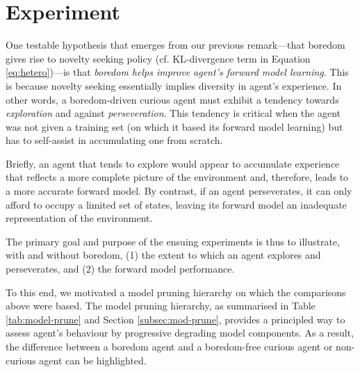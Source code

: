 \documentclass[utf8]{frontiersSCNS}
\newcommand{\bs}{\boldsymbol}
\begin{document}
%


\section{Experiment}

One testable hypothesis that emerges from our previous remark---that boredom gives rise to novelty seeking policy (cf. KL-divergence term in Equation \ref{eq:hetero})---is that {\it boredom helps improve agent's forward model learning}. This is because novelty seeking essentially implies diversity in agent's experience. In other words, a boredom-driven curious agent must exhibit a tendency towards {\it exploration} and against {\it perseveration}. This tendency is critical when the agent was not given a training set (on which it based its forward model learning) but has to self-assist in accumulating one from scratch. 

Briefly, an agent that tends to explore would appear to accumulate experience that reflects a more complete picture of the environment and, therefore, leads to a more accurate forward model. By contrast, if an agent perseverates, it can only afford to occupy a limited set of states, leaving its forward model an inadequate representation of the environment.

The primary goal and purpose of the ensuing experiments is thus to illustrate, with and without boredom, (1) the extent to which an agent explores and perseverates, and (2) the forward model performance. 

To this end, we motivated a model pruning hierarchy on which the comparisons above were based. The model pruning hierarchy, as summarised in Table \ref{tab:model-prune} and Section \ref{subsec:mod-prune}, provides a principled way to assess agent's behaviour by progressive degrading model components. As a result, the difference between a boredom agent and a boredom-free curious agent or non-curious agent can be highlighted. 
\end{document}
